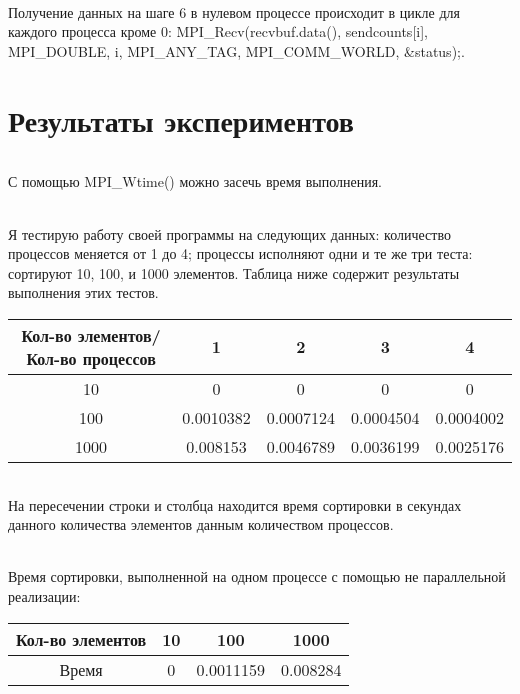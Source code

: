 \documentclass[12pt,a4paper]{article}
\begin{document}
\paragraph{}Получение данных на шаге 6 в нулевом процессе происходит в цикле для каждого процесса кроме 0: MPI\_Recv(recvbuf.data(), sendcounts[i], MPI\_DOUBLE, i, MPI\_ANY\_TAG, MPI\_COMM\_WORLD, \&status);.

\part*{Результаты экспериментов}
\paragraph{}С помощью MPI\_Wtime() можно засечь время выполнения.
\paragraph{}Я тестирую работу своей программы на следующих данных: количество процессов меняется от 1 до 4; процессы исполняют одни и те же три теста: сортируют 10, 100, и 1000 элементов. Таблица ниже содержит результаты выполнения этих тестов.
\begin{center}
\begin{tabular}{||c c c c c ||} 
 \hline
 Кол-во элементов/Кол-во процессов & 1 & 2 & 3 & 4 \\ [0.5ex] 
 \hline\hline
 10 & 0 & 0 & 0 & 0\\ 
 \hline
 100 & 0.0010382 & 0.0007124 & 0.0004504 & 0.0004002 \\
 \hline
 1000 & 0.008153 & 0.0046789 & 0.0036199 & 0.0025176 \\
[1ex] 
 \hline
\end{tabular}
\end{center}
\paragraph{}На пересечении строки и столбца находится время сортировки в секундах данного количества элементов данным количеством процессов.
\paragraph{}Время сортировки, выполненной на одном процессе с помощью не параллельной реализации:
\begin{center}
\begin{tabular}{||c c c c||} 
 \hline
 Кол-во элементов & 10 & 100 & 1000 \\ [0.5ex] 
 \hline\hline
 Время & 0 & 0.0011159 & 0.008284\\ 
[1ex] 
 \hline
\end{tabular}
\end{center}
\end{document}
